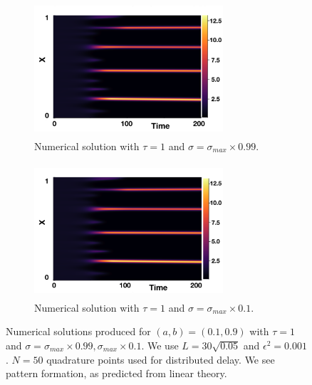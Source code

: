 \begin{figure}[H]
    \centering
    \begin{subfigure}[b]{0.45\textwidth}
        \centering
        \includegraphics[width=7cm,height=5cm]{distp1sig1.png}
        \caption{Numerical solution with $\tau=1$ and $\sigma=\sigma_{max}\times0.99$.}
        \label{}
    \end{subfigure}
    \hfill
    \begin{subfigure}[b]{0.45\textwidth}
        \centering
        \includegraphics[width=7cm,height=5cm]{distp1sig2.png}
        \caption{Numerical solution with $\tau=1$ and $\sigma=\sigma_{max}\times0.1$.}
        \label{}
    \end{subfigure}
    \caption{Numerical solutions produced for $(a,b)=(0.1,0.9)$ with $\tau=1$ and $\sigma=\sigma_{max}\times0.99, \sigma_{max}\times0.1$. We use $L=30\sqrt{0.05}$ and $\epsilon^2=0.001$. $N=50$ quadrature points used for distributed delay.
    We see pattern formation, as predicted from linear theory.}
    \label{fig:testdist1}
\end{figure}

